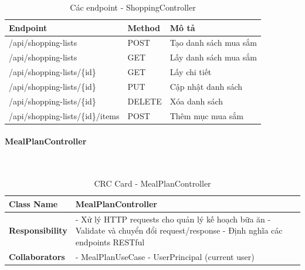 \begin{table}[H]
\small
\renewcommand{\arraystretch}{1.3}
\begin{tabularx}{\textwidth}{|>{\raggedright\arraybackslash}p{4.5cm}|>{\raggedright\arraybackslash}p{2cm}|X|}
\hline
\rowcolor{gray!20}
\textbf{Endpoint} & \textbf{Method} & \textbf{Mô tả} \\
\hline
/api/shopping-lists & POST & Tạo danh sách mua sắm \\
\hline
/api/shopping-lists & GET & Lấy danh sách mua sắm \\
\hline
/api/shopping-lists/\{id\} & GET & Lấy chi tiết \\
\hline
/api/shopping-lists/\{id\} & PUT & Cập nhật danh sách \\
\hline
/api/shopping-lists/\{id\} & DELETE & Xóa danh sách \\
\hline
/api/shopping-lists/\{id\}/items & POST & Thêm mục mua sắm \\
\hline
\end{tabularx}
\caption{Các endpoint - ShoppingController}
\end{table}

\paragraph{MealPlanController} ~\\

\begin{table}[H]
\small
\renewcommand{\arraystretch}{1.3}
\begin{tabularx}{\textwidth}{|>{\raggedright\arraybackslash}p{3.5cm}|X|}
\hline
\rowcolor{gray!20}
\textbf{Class Name} & MealPlanController \\
\hline
\textbf{Responsibility} & - Xử lý HTTP requests cho quản lý kế hoạch bữa ăn \newline - Validate và chuyển đổi request/response \newline - Định nghĩa các endpoints RESTful \\
\hline
\textbf{Collaborators} & - MealPlanUseCase \newline - UserPrincipal (current user) \\
\hline
\end{tabularx}
\caption{CRC Card - MealPlanController}
\end{table}

